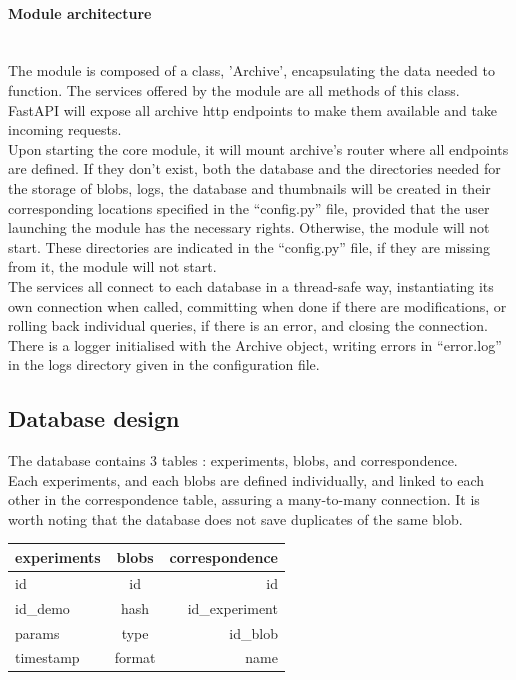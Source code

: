 \paragraph{Module architecture} \hspace{0pt} \\
The module is composed of a class, 'Archive', encapsulating the data needed to function. The services offered by the module are all methods of this class. FastAPI will expose all archive http endpoints to make them available and take incoming requests. \\
Upon starting the core module, it will mount archive's router where all endpoints are defined. If they don't exist, both the database and the directories needed for the storage of blobs, logs, the database and thumbnails will be created in their corresponding locations specified in the ``config.py'' file, provided that the user launching the module has the necessary rights. Otherwise, the module will not start. These directories are indicated in the ``config.py'' file, if they are missing from it, the module will not start. \\
The services all connect to each database in a thread-safe way, instantiating its own connection when called, committing when done if there are modifications, or rolling back individual queries, if there is an error, and closing the connection. \\
There is a logger initialised with the Archive object, writing errors in ``error.log'' in the logs directory given in the configuration file.

\subsection{Database design}

The database contains 3 tables : experiments, blobs, and correspondence.\\
Each experiments, and each blobs are defined individually, and linked to each other in the correspondence table, assuring a many-to-many connection. It is worth noting that the database does not save duplicates of the same blob. \\


\begin{tabular}{|l|c|r|}
  \hline
  experiments & blobs & correspondence \\
  \hline
  id & id & id \\
  id\_demo & hash & id\_experiment \\
  params & type & id\_blob \\
  timestamp & format & name \\
  \hline
\end{tabular} \\

